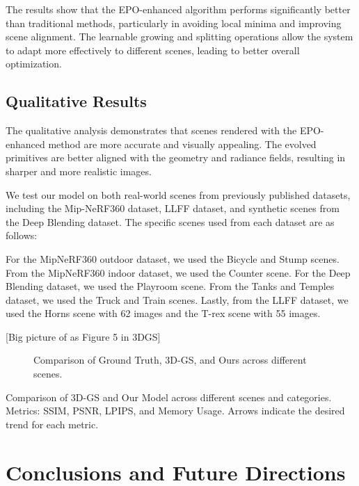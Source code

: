 \documentclass[11pt]{report}
\begin{document}
The results show that the EPO-enhanced algorithm performs significantly better than traditional methods, particularly in avoiding local minima and improving scene alignment. The learnable growing and splitting operations allow the system to adapt more effectively to different scenes, leading to better overall optimization.


\section{Qualitative Results}

The qualitative analysis demonstrates that scenes rendered with the EPO-enhanced method are more accurate and visually appealing. The evolved primitives are better aligned with the geometry and radiance fields, resulting in sharper and more realistic images.

We test our model on both real-world scenes from previously published datasets, including the Mip-NeRF360 dataset, LLFF dataset, and synthetic scenes from the Deep Blending dataset. The specific scenes used from each dataset are as follows: 

For the MipNeRF360 outdoor dataset, we used the Bicycle and Stump scenes. From the MipNeRF360 indoor dataset, we used the Counter scene. For the Deep Blending dataset, we used the Playroom scene. From the Tanks and Temples dataset, we used the Truck and Train scenes. Lastly, from the LLFF dataset, we used the Horns scene with 62 images and the T-rex scene with 55 images.

[Big picture of as Figure 5 in 3DGS]

\begin{figure}[h]
    \centering
    
    \caption{Comparison of Ground Truth, 3D-GS, and Ours across different scenes.}
    \label{fig:comparison}
\end{figure}

\begin{table}[h!]
    \centering
    
    \caption{Comparison of 3D-GS and Our Model across different scenes and categories. Metrics: SSIM, PSNR, LPIPS, and Memory Usage. Arrows indicate the desired trend for each metric.}
    \label{tab:comparison}
    \end{table}

\chapter{Conclusions and Future Directions}
\end{document}
